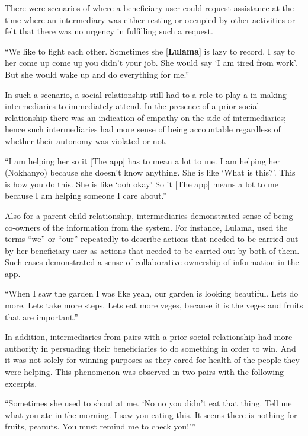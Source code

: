 There were scenarios of where a beneficiary user could request assistance at the time where an intermediary was either resting or occupied by other activities or felt that there was no urgency in fulfilling  such a request. 

 {``We like to fight each other. Sometimes she [\textbf{Lulama}] is lazy to record. I say to her come up come up you didn’t your job. She would say `I am tired from work'. But she would wake up and do everything for me.''}

In such a scenario, a social relationship still had to a role to play a in making intermediaries to immediately attend. In the presence of a prior social relationship there was an indication of empathy on the side of intermediaries; hence such intermediaries had more sense of being accountable regardless of whether their autonomy was violated or not.

 {``I am helping her so it [The app] has to mean a lot to me. I am helping her (Nokhanyo) because she doesn't know anything. She is like `What is this?'. This is how you do this. She is like `ooh okay' So it [The app] means a lot to me because I am helping someone I care about.''}

Also for a parent-child relationship,  intermediaries demonstrated sense of being co-owners of the information from the system. For instance, Lulama, used the terms ``we'' or ``our'' repeatedly to describe actions that needed to be carried out by her beneficiary user as actions that needed to be carried out by both of them. Such cases demonstrated  a sense of collaborative ownership of information in the app.
  
 {``When I saw the garden I was like yeah, our garden is looking beautiful. Lets do more. Lets take more steps. Lets eat more veges, because it is the veges and fruits that are important.''}

In addition, intermediaries from pairs with a prior social relationship had more authority in persuading their beneficiaries to do something in order to win. And it was not solely for winning purposes as they cared for health of the people they were helping. This phenomenon was observed in two pairs with the following excerpts.

 {``Sometimes she used to shout at me. `No no you didn't eat that thing. Tell me what you ate in the morning. I saw you eating this. It seems there is nothing for fruits, peanuts. You must remind me to check you!'''}

